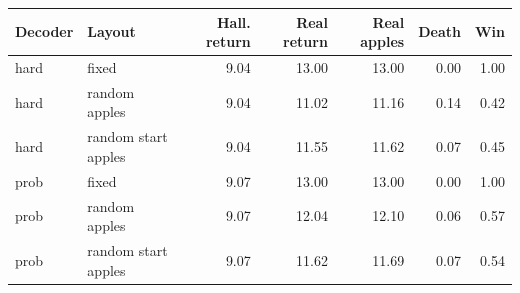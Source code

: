 \begin{tabular}{llrrrrr}
\toprule
Decoder & Layout & Hall. return & Real return & Real apples & Death & Win \\
\midrule
hard & fixed & 9.04 & 13.00 & 13.00 & 0.00 & 1.00 \\
hard & random apples & 9.04 & 11.02 & 11.16 & 0.14 & 0.42 \\
hard & random start apples & 9.04 & 11.55 & 11.62 & 0.07 & 0.45 \\
prob & fixed & 9.07 & 13.00 & 13.00 & 0.00 & 1.00 \\
prob & random apples & 9.07 & 12.04 & 12.10 & 0.06 & 0.57 \\
prob & random start apples & 9.07 & 11.62 & 11.69 & 0.07 & 0.54 \\
\bottomrule
\end{tabular}
